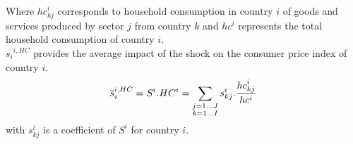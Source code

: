 \documentclass[11pt,a4paper]{article}
\begin{document}
Where ${hc}_{kj}^i$ corresponds to household consumption in country $i$ of goods and services produced by sector $j$ from country $k$ and $hc^i$ represents the total household consumption of country $i$. \\
$\overline{s_{i}}^{i,HC}$ provides the average impact of the shock on the consumer price index of country $i$. 
 \begin{eqnarray}
\overline{s}_{i}^{i,HC}=S^i.HC^i=\underset{\begin{subarray}{c}j=1\dots J \\ k=1 \dots I \end{subarray}}{\mathop \sum}\,{{s}_{kj}^i}.\frac{{hc}_{kj}^i}{hc^i}
\label{eq:eq6}
 \end{eqnarray} 
with ${s}_{kj}^i$ is a coefficient of $S^i$ for country $i$. 
\end{document}
